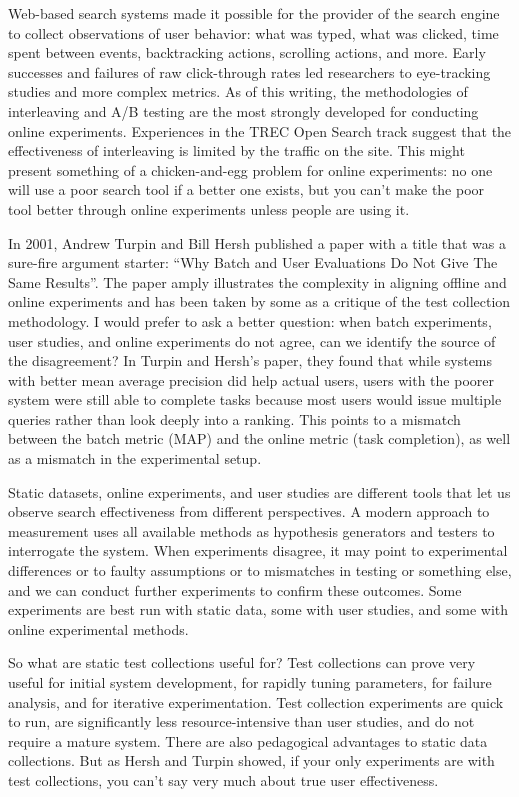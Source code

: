 \documentclass[nobib]{tufte-book}
\begin{document}
Web-based search systems made it possible for the provider of the search engine to collect observations of user behavior: what was typed, what was clicked, time spent between events, backtracking actions, scrolling actions, and more.  Early successes and failures of raw click-through rates led researchers to eye-tracking studies and more complex metrics.  As of this writing, the methodologies of interleaving and A/B testing are the most strongly developed for conducting online experiments.\autocite{kohavi_trustworthy_2020}  Experiences in the TREC Open Search track suggest that the effectiveness of interleaving is limited by the traffic on the site.  This might present something of a chicken-and-egg problem for online experiments: no one will use a poor search tool if a better one exists, but you can't make the poor tool better through online experiments unless people are using it.

In 2001, Andrew Turpin and Bill Hersh published a paper with a title that was a sure-fire argument starter: ``Why Batch and User Evaluations Do Not Give The Same Results''.\autocite{turpin_why_2001}   The paper amply illustrates the complexity in aligning offline and online experiments and has been taken by some as a critique of the test collection methodology.  I would prefer to ask a better question: when batch experiments, user studies, and online experiments do not agree, can we identify the source of the disagreement?  In Turpin and Hersh's paper, they found that while systems with better mean average precision did help actual users, users with the poorer system were still able to complete tasks because most users would issue multiple queries rather than look deeply into a ranking.  This points to a mismatch between the batch metric (MAP) and the online metric (task completion), as well as a mismatch in the experimental setup.  

Static datasets, online experiments, and user studies are different tools that let us observe search effectiveness from different perspectives.  A modern approach to measurement uses all available methods as hypothesis generators and testers to interrogate the system.  When experiments disagree, it may point to experimental differences or to faulty assumptions or to mismatches in testing or something else, and we can conduct further experiments to confirm these outcomes.  Some experiments are best run with static data, some with user studies, and some with online experimental methods.

So what are static test collections useful for?  Test collections can prove very useful for initial system development, for rapidly tuning parameters, for failure analysis, and for iterative experimentation.  Test collection experiments are quick to run, are significantly less resource-intensive than user studies, and do not require a mature system.  There are also pedagogical advantages to static data collections.  But as Hersh and Turpin showed, if your only experiments are with test collections, you can't say very much about true user effectiveness.
\end{document}
